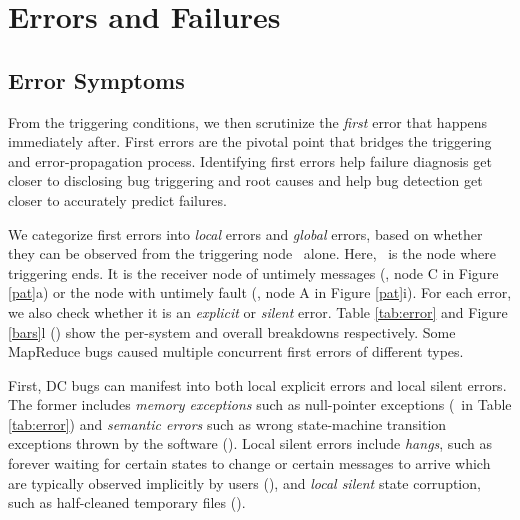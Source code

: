 



\section{Errors and Failures}
\label{sec-err}

\subsection{Error Symptoms}
\label{err-err}

From the triggering conditions, we then scrutinize the {\em first}
error that happens immediately after.  First errors are the pivotal
point that bridges the triggering and error-propagation process.
Identifying first errors help failure diagnosis get closer to
disclosing bug triggering and root causes and help bug detection get
closer to accurately predict failures.




We categorize first errors into {\em local} errors and {\em global}
errors, based on whether they can be observed from the triggering node
\nt\ alone.  Here, \nt\ is the node where triggering ends.  It is the
receiver node of untimely messages (\eg, node C in Figure \ref{pat}a)
or the node with untimely fault (\eg, node A in Figure \ref{pat}i).
For each error, we also check whether it is an {\it explicit} or {\em
  silent} error.  
Table \ref{tab:error} and Figure \ref{bars}l
(\BERR) show the per-system and overall breakdowns
respectively. 
Some MapReduce bugs caused multiple concurrent first errors of different types.

\fi


First, DC bugs can manifest into both local explicit errors and local
silent errors. The former includes
%
{\em memory exceptions} such as null-pointer exceptions
(\pctErrLocMem\ in Table \ref{tab:error}) and {\em semantic errors} 
such as wrong state-machine transition exceptions thrown by 
the software (\pctErrLocSem).
%
Local silent errors include
%
{\em hangs}, such as forever waiting for certain states to change
or certain messages to arrive which are typically observed implicitly
by users (\pctErrLocHang),
%
and {\em local silent} state corruption, such as half-cleaned
temporary files (\pctErrLocSil).


